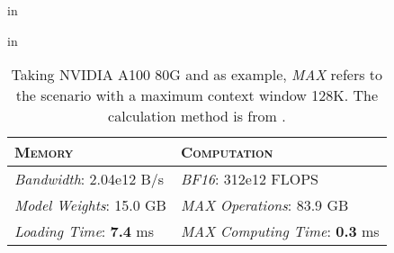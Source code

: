 \begin{table}[ht!]
    \centering
    \small
     in
    \caption{Taking NVIDIA A100 80G and \llama as example, \textit{MAX} refers to the scenario with a maximum context window 128K. The calculation method is from \citet{llm_viewer}.}
    \label{tab:time}
     in
    \begin{tabular}{l|l}
    \toprule
    \textsc{Memory} & \textsc{Computation} \\ \midrule
    \textit{Bandwidth}: 2.04e12 B/s & \textit{BF16}: 312e12 FLOPS \\ 
    \textit{Model Weights}: 15.0 GB & \textit{MAX Operations}: 83.9 GB\\ \midrule
    \textit{Loading Time}: \textbf{7.4} ms & \textit{MAX Computing Time}: \textbf{0.3} ms\\
    \bottomrule
    \end{tabular}
\end{table}